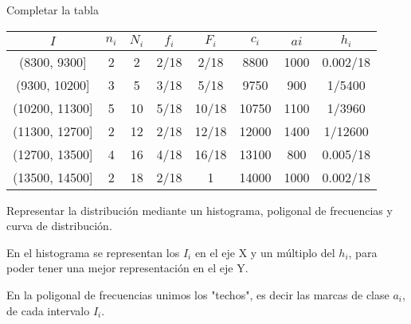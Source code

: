\subproblem
Completar la tabla
\begin{center}
		\begin{center}
			\begin{tabular}{|c|c|c|c|c|c|c|c|}
				\hline
				$I$ & $n_{i}$ & $N_{i}$ & $f_{i}$ & $F_{i}$ & $c_{i}$ & $a{i}$ & $h_{i}$\\\hline
				(8300, 9300] & 2 & 2 & 2/18 & 2/18 & 8800 & 1000 & 0.002/18 \\ \hline
				(9300, 10200] & 3 & 5 & 3/18 & 5/18 & 9750 & 900 & 1/5400 \\ \hline
				(10200, 11300] & 5 & 10 & 5/18 & 10/18 & 10750 & 1100 & 1/3960 \\ \hline
				(11300, 12700] & 2 & 12 & 2/18 & 12/18 & 12000 & 1400 & 1/12600 \\ \hline
				(12700, 13500] & 4 & 16 & 4/18 & 16/18 & 13100 & 800 & 0.005/18 \\ \hline
				(13500, 14500] & 2 & 18 & 2/18 & 1 & 14000 & 1000 & 0.002/18\\ \hline
			\end{tabular}
		\end{center}
\end{center}
\newpage
\subproblem
Representar la distribución mediante un histograma, poligonal de frecuencias y curva de
distribución.

\begin{center}
En el histograma se representan los $I_{i}$ en el eje X y un múltiplo del $h_{i}$, para poder tener una mejor representación en el eje Y. 
\end{center}

\begin{center}
\end{center}

\begin{center}
En la poligonal de frecuencias unimos los "techos", es decir las marcas de clase $a_{i}$, de cada intervalo $I_{i}$.
\end{center}


